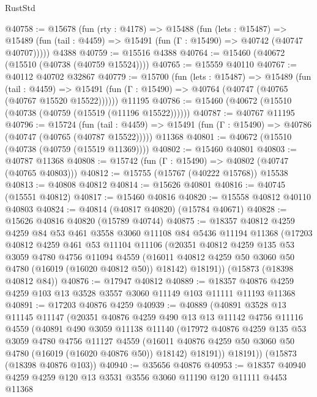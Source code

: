 \begin{lexlean}{RustStd}
\begin{coremodule}
@40758 := @15678
    (fun (rty : @4178) =>
    @15488
      (fun (lets : @15487) =>
      @15489 (fun (tail : @4459) => @15491 (fun (Γ : @15490) => @40742 (@40747 @40707)))))
    @4388
@40759 := @15516 @4388
@40764 := @15460 (@40672 (@15510 (@40738 (@40759 @15524))))
@40765 := @15559 @40110
@40767 := @40112 @40702 @32867
@40779 := @15700
    (fun (lets : @15487) =>
    @15489
      (fun (tail : @4459) =>
      @15491 (fun (Γ : @15490) => @40764 (@40747 (@40765 (@40767 @15520 @15522))))))
    @11195
@40786 := @15460 (@40672 (@15510 (@40738 (@40759 (@15519 (@11196 @15522))))))
@40787 := @40767 @11195
@40796 := @15724
    (fun (tail : @4459) => @15491 (fun (Γ : @15490) => @40786 (@40747 (@40765 (@40787 @15522)))))
    @11368
@40801 := @40672 (@15510 (@40738 (@40759 (@15519 @11369))))
@40802 := @15460 @40801
@40803 := @40787 @11368
@40808 := @15742 (fun (Γ : @15490) => @40802 (@40747 (@40765 @40803)))
@40812 := @15755 (@15767 (@40222 @15768)) @15538
@40813 := @40808 @40812
@40814 := @15626 @40801
@40816 := @40745 (@15551 @40812)
@40817 := @15460 @40816
@40820 := @15558 @40812 @40110 @40803
@40824 := @40814 (@40817 @40820) (@15784 @40671)
@40828 := @15626 @40816 @40820 (@15789 @40744)
@40875 := @18357
    @40812
    @4259
    @4259
    @84
    @53
    @461
    @3558
    @3060
    @11108
    @84
    @5436
    @11194
    @11368
    (@17203
      @40812
      @4259
      @461
      @53
      @11104
      @11106
      (@20351
        @40812
        @4259
        @135
        @53
        @3059
        @4780
        @4756
        @11094
        @4559
        (@16011 @40812 @4259 @50 @3060 @50 @4780 (@16019 (@16020 @40812 @50)) @18142)
        @18191))
    (@15873 (@18398 @40812 @84))
@40876 := @17947 @40812
@40889 := @18357 @40876 @4259 @4259 @103 @13 @3528 @3557 @3060 @11149 @103 @11111 @11193 @11368
@40891 := @17203 @40876 @4259
@40939 := @40889
    (@40891
      @3528
      @13
      @11145
      @11147
      (@20351
        @40876
        @4259
        @490
        @13
        @13
        @11142
        @4756
        @11116
        @4559
        (@40891
          @490
          @3059
          @11138
          @11140
          (@17972
            @40876
            @4259
            @135
            @53
            @3059
            @4780
            @4756
            @11127
            @4559
            (@16011 @40876 @4259 @50 @3060 @50 @4780 (@16019 (@16020 @40876 @50)) @18142)
            @18191))
        @18191))
    (@15873 (@18398 @40876 @103))
@40940 := @35656 @40876
@40953 := @18357 @40940 @4259 @4259 @120 @13 @3531 @3556 @3060 @11190 @120 @11111 @4453 @11368

\end{coremodule}
\end{lexlean}
